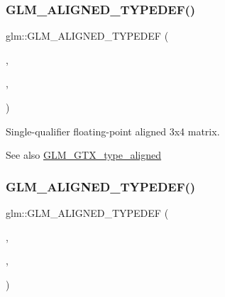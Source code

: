 \subsubsection{\texorpdfstring{G\+L\+M\+\_\+\+A\+L\+I\+G\+N\+E\+D\+\_\+\+T\+Y\+P\+E\+D\+E\+F()}{GLM\_ALIGNED\_TYPEDEF()}\hspace{0.1cm}{\footnotesize\ttfamily [177/209]}}
{\footnotesize\ttfamily glm\+::\+G\+L\+M\+\_\+\+A\+L\+I\+G\+N\+E\+D\+\_\+\+T\+Y\+P\+E\+D\+EF (\begin{DoxyParamCaption}\item[{\mbox{\hyperlink{group__gtc__type__precision_gab2daf8468a8b9343c065816df07e29fe}{fmat3x4}}}]{,  }\item[{aligned\+\_\+fmat3x4}]{,  }\item[{16}]{ }\end{DoxyParamCaption})}

Single-\/qualifier floating-\/point aligned 3x4 matrix. \begin{DoxySeeAlso}{See also}
\mbox{\hyperlink{group__gtx__type__aligned}{G\+L\+M\+\_\+\+G\+T\+X\+\_\+type\+\_\+aligned}} 
\end{DoxySeeAlso}
\mbox{\label{group__gtx__type__aligned_ga93f09768241358a287c4cca538f1f7e7}} 
\subsubsection{\texorpdfstring{G\+L\+M\+\_\+\+A\+L\+I\+G\+N\+E\+D\+\_\+\+T\+Y\+P\+E\+D\+E\+F()}{GLM\_ALIGNED\_TYPEDEF()}\hspace{0.1cm}{\footnotesize\ttfamily [178/209]}}
{\footnotesize\ttfamily glm\+::\+G\+L\+M\+\_\+\+A\+L\+I\+G\+N\+E\+D\+\_\+\+T\+Y\+P\+E\+D\+EF (\begin{DoxyParamCaption}\item[{\mbox{\hyperlink{group__gtc__type__precision_ga279cf309f0098c3d26ce88fe8a26375a}{fmat4x2}}}]{,  }\item[{aligned\+\_\+fmat4x2}]{,  }\item[{16}]{ }\end{DoxyParamCaption})}

